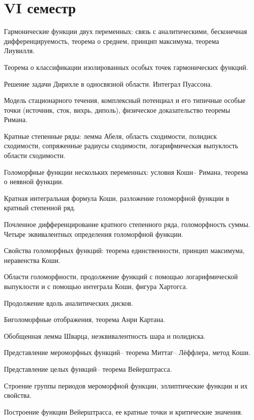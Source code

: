 \documentclass[a4paper]{article}
\begin{document}
\section*{VI семестр}
\begin{nums}{-2}
\item Гармонические функции двух переменных: связь с аналитическими, бесконечная дифференцируемость,
      теорема о среднем, принцип максимума, теорема Лиувилля.
\item Теорема о классификации изолированных особых точек гармонических функций.
\item Решение задачи Дирихле в односвязной области. Интеграл Пуассона.
\item Модель стационарного течения, комплексный потенциал и его типичные особые точки (источник,
      сток, вихрь, диполь), физическое доказательство теоремы Римана.
\item Кратные степенные ряды: лемма Абеля, область сходимости, полидиск сходимости, сопряженные
      радиусы сходимости, логарифмическая выпуклость области сходимости.
\item Голоморфные функции нескольких переменных: условия Коши-- Римана,  теорема о неявной функции.
\item Кратная интегральная формула Коши, разложение голоморфной функции в кратный степенной ряд.
\item Почленное дифференцирование кратного степенного ряда, голоморфность суммы. Четыре эквивалентных
      определения голоморфной функции.
\item Свойства голоморфных функций: теорема единственности, принцип максимума, неравенства Коши.
\item Области голоморфности, продолжение функций с помощью логарифмической выпуклости и с помощью
      интеграла Коши, фигура Хартогса.
\item Продолжение вдоль аналитических дисков.
\item Биголоморфные отображения, теорема Анри Картана.
\item Обобщенная лемма Шварца,  неэквивалентность шара и полидиска.
\item Представление мероморфных функций-- теорема Миттаг-- Лёффлера, метод Коши.
\item Представление целых функций-- теорема Вейерштрасса.
\item Строение группы периодов мероморфной функции, эллиптические функции и их свойства.
\item Построение функции Вейерштрасса, ее кратные точки и критические значения.

\end{nums}
\end{document}
